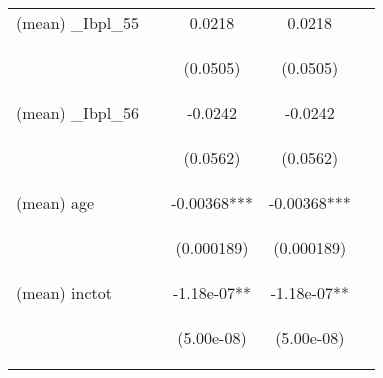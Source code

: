 \documentclass[]{article}
\begin{document}
\begin{center}
\begin{tabular}{lcccc}
(mean) \_Ibpl\_55 &  & 0.0218 & 0.0218 &  \\
\vspace{4pt} & \begin{footnotesize}\end{footnotesize} & \begin{footnotesize}(0.0505)\end{footnotesize} & \begin{footnotesize}(0.0505)\end{footnotesize} & \begin{footnotesize}\end{footnotesize} \\
(mean) \_Ibpl\_56 &  & -0.0242 & -0.0242 &  \\
\vspace{4pt} & \begin{footnotesize}\end{footnotesize} & \begin{footnotesize}(0.0562)\end{footnotesize} & \begin{footnotesize}(0.0562)\end{footnotesize} & \begin{footnotesize}\end{footnotesize} \\
(mean) age &  & -0.00368*** & -0.00368*** &  \\
\vspace{4pt} & \begin{footnotesize}\end{footnotesize} & \begin{footnotesize}(0.000189)\end{footnotesize} & \begin{footnotesize}(0.000189)\end{footnotesize} & \begin{footnotesize}\end{footnotesize} \\
(mean) inctot &  & -1.18e-07** & -1.18e-07** &  \\
\vspace{4pt} & \begin{footnotesize}\end{footnotesize} & \begin{footnotesize}(5.00e-08)\end{footnotesize} & \begin{footnotesize}(5.00e-08)\end{footnotesize} & \begin{footnotesize}\end{footnotesize} \\

\end{tabular}
\end{center}
\end{document}
